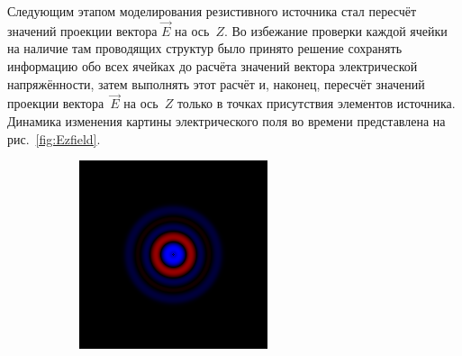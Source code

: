 Следующим этапом моделирования резистивного источника стал пересчёт
значений проекции вектора $ \vec{E} $ на ось~$ Z $. Во избежание проверки каждой ячейки на наличие там проводящих структур было принято решение сохранять информацию обо всех ячейках до расчёта значений вектора электрической напряжённости, затем выполнять этот расчёт и, наконец, пересчёт значений проекции
вектора~$ \vec{E} $ на ось~$ Z $ только в точках присутствия элементов источника. Динамика изменения картины электрического поля во времени представлена на рис.~\ref{fig:Ezfield}.

\begin{figure}[p]
    \centering
    \vspace{30mm}
    \begin{subfigure}[b]{0.3\textwidth}
        \includegraphics[width=\textwidth]{include/graphics/image6}
    \end{subfigure}
    ~
    \begin{subfigure}[b]{0.3\textwidth}

\end{subfigure}
\end{figure}
